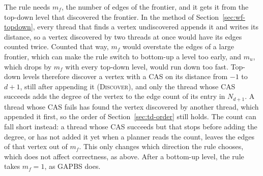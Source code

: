 The rule needs $m_f$, the number of edges of the frontier, and it gets it from the top-down level that discovered the frontier. In the method of Section~\ref{sec:wf-topdown}, every thread that finds a vertex undiscovered appends it and writes its distance, so a vertex discovered by two threads at once would have its edges counted twice. Counted that way, $m_f$ would overstate the edges of a large frontier, which can make the rule switch to bottom-up a level too early, and $m_u$, which drops by $m_f$ with every top-down level, would run down too fast. Top-down levels therefore discover a vertex with a CAS on its distance from $-1$ to $d+1$, still after appending it (\textsc{Discover}), and only the thread whose CAS succeeds adds the degree of the vertex to the edge count of its entry in $N_{d+1}$. A thread whose CAS fails has found the vertex discovered by another thread, which appended it first, so the order of Section~\ref{sec:td-order} still holds. The count can fall short instead: a thread whose CAS succeeds but that stops before adding the degree, or has not added it yet when a planner reads the count, leaves the edges of that vertex out of $m_f$. This only changes which direction the rule chooses, which does not affect correctness, as above. After a bottom-up level, the rule takes $m_f = 1$, as GAPBS does.

